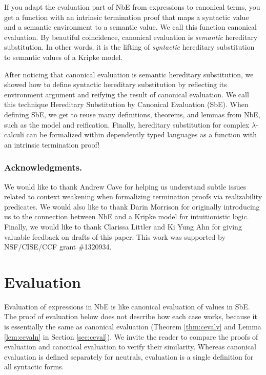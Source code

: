 \documentclass[runningheads,a4paper]{llncs}
\newcommand{\refthm}[1]{Theorem \ref{thm:#1}}
\newcommand{\reflem}[1]{Lemma \ref{lem:#1}}
\newcommand{\refsec}[1]{Section \ref{sec:#1}}
\begin{document}
If you adapt the evaluation part of NbE from expressions to canonical
terms, you get a function with an intrinsic termination proof that
maps a syntactic value and a semantic environment to a semantic value.
We call this function canonical evaluation. By beautiful coincidence,
canonical evaluation is \textit{semantic} hereditary substitution. In
other words, it is the
lifting of \textit{syntactic} hereditary substitution to semantic values of a
Kripke model.

After noticing that canonical evaluation is semantic hereditary
substitution, we showed how to define syntactic hereditary
substitution by reflecting its environment argument and reifying the
result of canonical evaluation. We call this technique Hereditary
Substitution by Canonical Evaluation (SbE). When defining SbE, we get
to reuse many definitions, theorems, and lemmas from NbE, such as the
model and reification. Finally, hereditary substitution for complex
$\lambda$-calculi can be formalized within dependently typed languages
as a function with an intrinsic termination proof!

\subsubsection*{Acknowledgments.}
We would like to thank Andrew Cave for helping us understand subtle
issues related to context weakening when formalizing termination
proofs via realizability predicates. We would also
like to thank Darin Morrison for originally introducing us to the connection
between NbE and a Kripke model for intuitionistic logic. Finally, we
would like to thank Clarissa Littler and Ki Yung Ahn for giving
valuable feedback on drafts of this paper.
This work was supported by NSF/CISE/CCF grant \#1320934.






\clearpage

\section*{\appendixname}
\appendix

\section{Evaluation}
\label{sec:eval}

Evaluation of expressions in NbE is like canonical evaluation of
values in SbE. The proof of evaluation below does not describe how
each case works, because it is essentially the same as
canonical evaluation (\refthm{cevalv} and \reflem{cevaln} in
\refsec{ceval}). We invite the reader to compare the proofs of
evaluation and canonical evaluation to verify their similarity.
Whereas canonical evaluation is defined separately for neutrals,
evaluation is a single definition for all syntactic forms.
\end{document}
